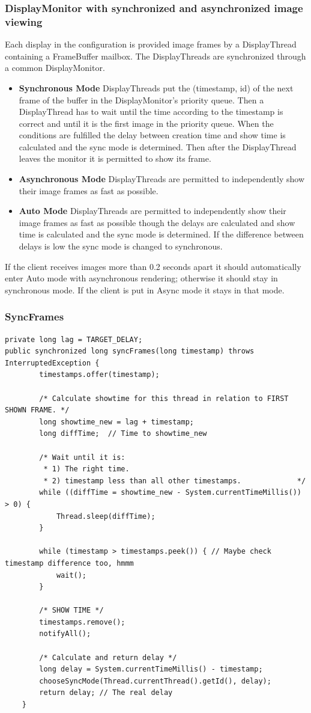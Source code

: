 \documentclass[8pt,titlepage]{article}
\begin{document}
\subsubsection{DisplayMonitor with synchronized and asynchronized image viewing}
Each display in the configuration is provided image frames by a DisplayThread containing a FrameBuffer mailbox. The DisplayThreads are synchronized through a common DisplayMonitor.

\begin{itemize}
\item \textbf{Synchronous Mode} DisplayThreads put the (timestamp, id) of the next frame of the buffer in the DisplayMonitor’s priority queue. Then a DisplayThread has to wait until the time according to the timestamp is correct and until it is the first image in the priority queue. When the conditions are fulfilled the delay between creation time and show time is calculated and the sync mode is determined. Then after the DisplayThread leaves the monitor it is permitted to show its frame. 	
\item \textbf{Asynchronous Mode} DisplayThreads are permitted to independently show their image frames as fast as possible.
\item \textbf{Auto Mode} DisplayThreads are permitted to independently show their image frames as fast as possible though the delays are calculated and show time is calculated and the sync mode is determined. If the difference between delays is low the sync mode is changed to synchronous.
\end{itemize}

If the client receives images more than 0.2 seconds apart it should automatically enter Auto mode with asynchronous rendering; otherwise it should stay in synchronous mode. If the client is put in Async mode it stays in that mode.

\subsubsection{SyncFrames}
\begin{verbatim}
private long lag = TARGET_DELAY;
public synchronized long syncFrames(long timestamp) throws InterruptedException {
		timestamps.offer(timestamp);

		/* Calculate showtime for this thread in relation to FIRST SHOWN FRAME. */
		long showtime_new = lag + timestamp;				
		long diffTime;	// Time to showtime_new

		/* Wait until it is:
		 * 1) The right time.
		 * 2) timestamp less than all other timestamps.				*/				
		while ((diffTime = showtime_new - System.currentTimeMillis()) > 0) {
			Thread.sleep(diffTime);		
		} 

		while (timestamp > timestamps.peek()) { // Maybe check timestamp difference too, hmmm
			wait();
		}

		/* SHOW TIME */
		timestamps.remove();
		notifyAll();

		/* Calculate and return delay */
		long delay = System.currentTimeMillis() - timestamp;					
		chooseSyncMode(Thread.currentThread().getId(), delay);
		return delay; // The real delay
	}


\end{verbatim}
\end{document}
